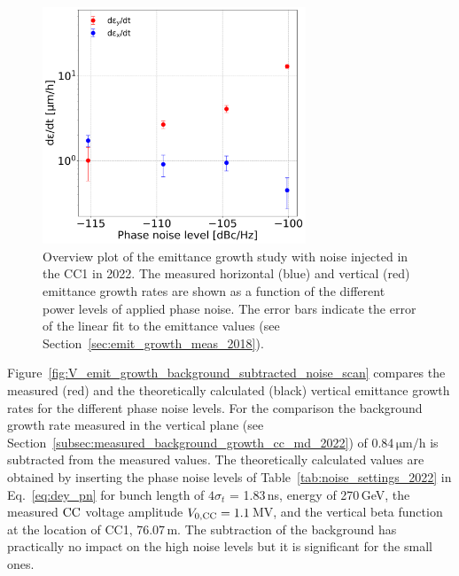 \begin{figure}[!h] 
     \centering         
   \includegraphics[width=0.7\textwidth]{images/Ch8/emit_H_and_V_noise_scan.png}
       \caption{Overview plot of the emittance growth study with noise injected in the CC1 in 2022. The measured horizontal (blue) and vertical (red) emittance growth rates are shown as a function of the different power levels of applied phase noise. The error bars indicate the error of the linear fit to the emittance values (see Section~\ref{sec:emit_growth_meas_2018}).}
       \label{fig:H_V_emit_growth_noise_scan}
\end{figure}


Figure~\ref{fig:V_emit_growth_background_subtracted_noise_scan} compares the measured (red) and the theoretically calculated (black) vertical emittance growth rates for the different phase noise levels. For the comparison the background growth rate measured in the vertical plane (see Section~\ref{subsec:measured_background_growth_cc_md_2022}) of 0.84\,$\mathrm{\mu m /h}$ is subtracted from the measured values. The theoretically calculated values are obtained by inserting the phase noise levels of Table~\ref{tab:noise_settings_2022} in Eq.~\eqref{eq:dey_pn} for bunch length of $4 \sigma_t$ = 1.83\,ns, energy of 270\,GeV, the measured ${\mathrm{CC}}$ voltage amplitude ${V_\mathrm{0, CC}}=1.1$\,MV, and the vertical beta function at the location of CC1, 76.07\,m. The subtraction of the background has practically no impact on the high noise levels but it is significant for the small ones.

